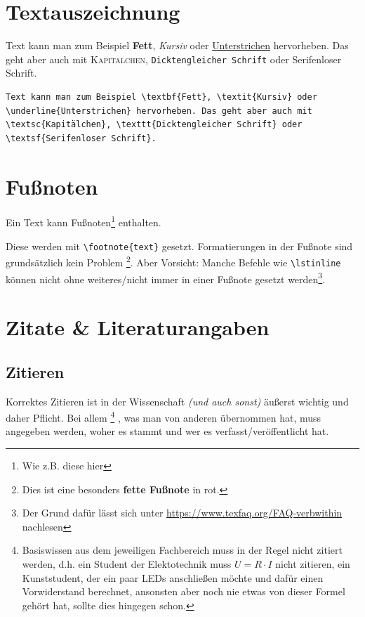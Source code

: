 	\section{Textauszeichnung}
		\begin{vorlagenbeispiel}
			Text kann man zum Beispiel \textbf{Fett}, \textit{Kursiv} oder \underline{Unterstrichen} hervorheben. Das geht aber auch mit \textsc{Kapitälchen}, \texttt{Dicktengleicher Schrift} oder \textsf{Serifenloser Schrift}.
		\end{vorlagenbeispiel}
		\begin{lstlisting}[keywords={textbf, textit, underline, textsc, texttt, textsf}]
Text kann man zum Beispiel \textbf{Fett}, \textit{Kursiv} oder \underline{Unterstrichen} hervorheben. Das geht aber auch mit \textsc{Kapitälchen}, \texttt{Dicktengleicher Schrift} oder \textsf{Serifenloser Schrift}.
		\end{lstlisting}
					
	\section{Fußnoten}
		\begin{vorlagenbeispiel}
		Ein Text kann Fußnoten\footnote{Wie z.B. diese hier} enthalten.
		\end{vorlagenbeispiel}
		Diese werden mit \lstinline|\footnote{text}| gesetzt. Formatierungen in der Fußnote sind grundsätzlich kein Problem%
		\footnote{%
			\color{red}Dies ist eine besonders \textbf{fette Fußnote} in rot.
		}.
%		
		Aber Vorsicht: Manche Befehle wie \zb \lstinline|\lstinline| können nicht ohne weiteres/nicht immer in einer Fußnote gesetzt werden\footnote{Der Grund dafür lässt sich unter \url{https://www.texfaq.org/FAQ-verbwithin} nachlesen}.
	
	\section{Zitate \& Literaturangaben}
		\subsection{Zitieren}
			Korrektes Zitieren ist in der Wissenschaft \emph{(und auch sonst)} äußerst wichtig und daher Pflicht.
%			
			Bei allem%
				\footnote{Basiswissen aus dem jeweiligen Fachbereich muss in der Regel nicht zitiert werden, d.h. ein Student der Elektotechnik muss $U = R \cdot I$ nicht zitieren, ein Kunststudent, der ein paar LEDs anschließen möchte und dafür einen Vorwiderstand berechnet, ansonsten aber noch nie etwas von dieser Formel gehört hat, sollte dies hingegen schon.}%
			, was man von anderen übernommen hat, muss angegeben werden, woher es stammt und wer es verfasst/veröffentlicht hat.
				\medskip
					
